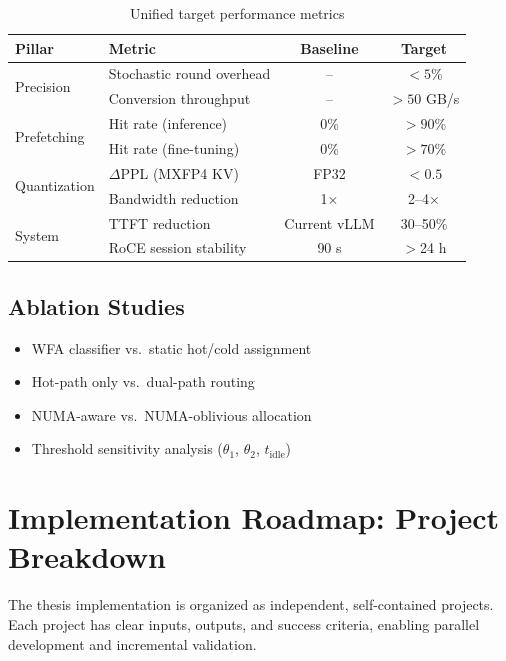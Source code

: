 \documentclass[11pt,letterpaper]{article}
\theoremstyle{definition}
\begin{document}
\begin{table}[htbp]
\centering
\caption{Unified target performance metrics}
\label{tab:unified-targets}
\begin{tabular}{@{}llcc@{}}
\toprule
\textbf{Pillar} & \textbf{Metric} & \textbf{Baseline} & \textbf{Target} \\
\midrule
\multirow{2}{*}{Precision} & Stochastic round overhead & -- & $< 5\%$ \\
 & Conversion throughput & -- & $> 50$ GB/s \\
\midrule
\multirow{2}{*}{Prefetching} & Hit rate (inference) & 0\% & $> 90\%$ \\
 & Hit rate (fine-tuning) & 0\% & $> 70\%$ \\
\midrule
\multirow{2}{*}{Quantization} & $\Delta$PPL (MXFP4 KV) & FP32 & $< 0.5$ \\
 & Bandwidth reduction & 1$\times$ & 2--4$\times$ \\
\midrule
\multirow{2}{*}{System} & TTFT reduction & Current vLLM & 30--50\% \\
 & RoCE session stability & 90 s & $>$24 h \\
\bottomrule
\end{tabular}
\end{table}

\subsection{Ablation Studies}

\begin{itemize}
    \item WFA classifier vs.\ static hot/cold assignment
    \item Hot-path only vs.\ dual-path routing
    \item NUMA-aware vs.\ NUMA-oblivious allocation
    \item Threshold sensitivity analysis ($\theta_1$, $\theta_2$, $t_{\text{idle}}$)
\end{itemize}

\section{Implementation Roadmap: Project Breakdown}
\label{sec:roadmap}

The thesis implementation is organized as independent, self-contained projects. Each project has clear inputs, outputs, and success criteria, enabling parallel development and incremental validation.
\end{document}
